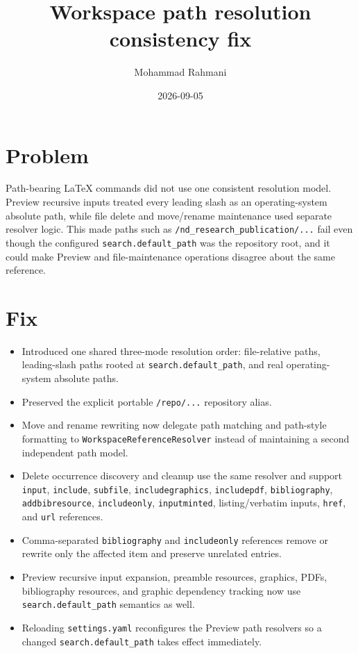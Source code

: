 \documentclass[a4paper]{article}
\title{Workspace path resolution consistency fix}
\date{2026-09-05}
\author{Mohammad Rahmani}
\begin{document}
\maketitle

\section{Problem}
Path-bearing LaTeX commands did not use one consistent resolution model. Preview
recursive inputs treated every leading slash as an operating-system absolute path,
while file delete and move/rename maintenance used separate resolver logic. This
made paths such as \texttt{/nd\_research\_publication/...} fail even though the
configured \texttt{search.default\_path} was the repository root, and it could
make Preview and file-maintenance operations disagree about the same reference.

\section{Fix}
\begin{itemize}
   \item Introduced one shared three-mode resolution order: file-relative paths, leading-slash paths rooted at \texttt{search.default\_path}, and real operating-system absolute paths.
   \item Preserved the explicit portable \texttt{/repo/...} repository alias.
   \item Move and rename rewriting now delegate path matching and path-style formatting to \texttt{WorkspaceReferenceResolver} instead of maintaining a second independent path model.
   \item Delete occurrence discovery and cleanup use the same resolver and support \texttt{input}, \texttt{include}, \texttt{subfile}, \texttt{includegraphics}, \texttt{includepdf}, \texttt{bibliography}, \texttt{addbibresource}, \texttt{includeonly}, \texttt{inputminted}, listing/verbatim inputs, \texttt{href}, and \texttt{url} references.
   \item Comma-separated \texttt{bibliography} and \texttt{includeonly} references remove or rewrite only the affected item and preserve unrelated entries.
   \item Preview recursive input expansion, preamble resources, graphics, PDFs, bibliography resources, and graphic dependency tracking now use \texttt{search.default\_path} semantics as well.
   \item Reloading \texttt{settings.yaml} reconfigures the Preview path resolvers so a changed \texttt{search.default\_path} takes effect immediately.
\end{itemize}
\end{document}
